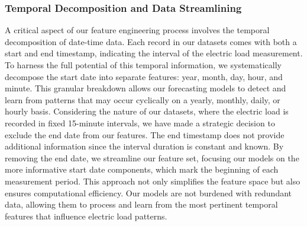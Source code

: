 \documentclass{article} %
\begin{document}
\subsubsection{Temporal Decomposition and Data Streamlining}
A critical aspect of our feature engineering process involves the temporal decomposition of date-time data. Each record in our datasets comes with both a start and end timestamp, indicating the interval of the electric load measurement. To harness the full potential of this temporal information, we systematically decompose the start date into separate features: year, month, day, hour, and minute. This granular breakdown allows our forecasting models to detect and learn from patterns that may occur cyclically on a yearly, monthly, daily, or hourly basis. 
Considering the nature of our datasets, where the electric load is recorded in fixed 15-minute intervals, we have made a strategic decision to exclude the end date from our features. The end timestamp does not provide additional information since the interval duration is constant and known. By removing the end date, we streamline our feature set, focusing our models on the more informative start date components, which mark the beginning of each measurement period. This approach not only simplifies the feature space but also ensures computational efficiency. Our models are not burdened with redundant data, allowing them to process and learn from the most pertinent temporal features that influence electric load patterns. 
\end{document}
